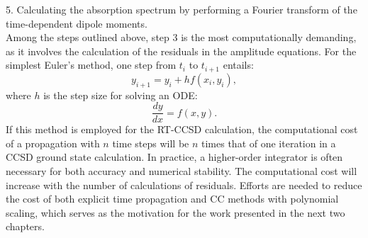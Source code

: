 5. Calculating the absorption spectrum by performing a Fourier transform of the time-dependent dipole moments. \\
Among the steps outlined above, step 3 is the most computationally demanding, as it involves the calculation of the residuals in the amplitude equations. For the simplest Euler's method,\cite{Atkinson1991} one step from $t_{i}$ to $t_{i+1}$ entails:
\begin{equation}
y_{i+1} = y_{i} + hf(x_{i}, y_{i}),
\end{equation}
where $h$ is the step size for solving an ODE: 
\begin{equation}
\frac{dy}{dx}=f(x, y).
\end{equation}
If this method is employed for the RT-CCSD calculation, the computational cost of a propagation with $n$ time steps will be $n$ times that of one iteration in a CCSD ground state calculation. In practice, a higher-order integrator is often necessary for both accuracy and numerical stability.\cite{Pedersen2019} The computational cost will increase with the number of calculations of residuals. Efforts are needed to reduce the cost of both explicit time propagation and CC methods with polynomial scaling, which serves as the motivation for the work presented in the next two chapters.


























